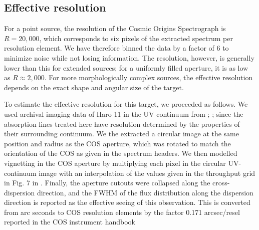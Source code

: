 \documentclass[twocolumn]{aastex61}
\begin{document}
\subsection{Effective resolution}\label{effective-resolution}

For a point source, the resolution of the Cosmic Origins Spectrograph is
$R=20,000$, which corresponds to six pixels of the extracted spectrum
per resolution element. We have therefore binned the data by a factor of
6 to minimize noise while not losing information. The resolution,
however, is generally lower than this for extended sources; for a
uniformly filled aperture, it is as low as $R\approx2,000$. For more
morphologically complex sources, the effective resolution depends on the
exact shape and angular size of the target.

To estimate the effective resolution for this target, we proceeded as
follows. We used archival imaging data of Haro 11 in the UV-continuum
from \citet{Ostlin2009}; \citet{Hayes2009}; since the absorption lines
treated here have resolution determined by the properties of their
surrounding continuum. We the extracted a circular image at the same
position and radius as the COS aperture, which was rotated to match the
orientation of the COS as given in the spectrum headers. We then
modelled vignetting in the COS aperture by multiplying each pixel in the
circular UV-continuum image with an interpolation of the values given in
the throughput grid in Fig. 7 in \citet{CosImaging}. Finally, the
aperture cutouts were collapsed along the cross-dispersion direction,
and the FWHM of the flux distribution along the dispersion direction is
reported as the effective seeing of this observation. This is converted
from arc seconds to COS resolution elements by the factor 0.171
arcsec/resel reported in the COS instrument handbook \citep{CosHandbook}
\end{document}
